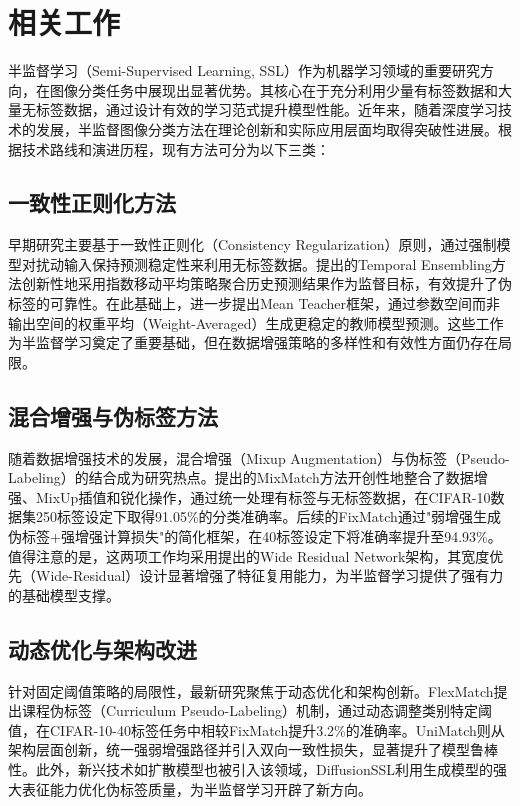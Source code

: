 \documentclass[a4paper, utf8]{ctexart}
\begin{document}
	\section{相关工作}
	
	半监督学习（Semi-Supervised Learning, SSL）作为机器学习领域的重要研究方向，在图像分类任务中展现出显著优势。其核心在于充分利用少量有标签数据和大量无标签数据，通过设计有效的学习范式提升模型性能。近年来，随着深度学习技术的发展，半监督图像分类方法在理论创新和实际应用层面均取得突破性进展。根据技术路线和演进历程，现有方法可分为以下三类：
	
	\subsection{一致性正则化方法}
	
	早期研究主要基于一致性正则化（Consistency Regularization）原则，通过强制模型对扰动输入保持预测稳定性来利用无标签数据。\cite{pimodel}提出的Temporal Ensembling方法创新性地采用指数移动平均策略聚合历史预测结果作为监督目标，有效提升了伪标签的可靠性。在此基础上，\cite{meanteacher}进一步提出Mean Teacher框架，通过参数空间而非输出空间的权重平均（Weight-Averaged）生成更稳定的教师模型预测。这些工作为半监督学习奠定了重要基础，但在数据增强策略的多样性和有效性方面仍存在局限。
	
	\subsection{混合增强与伪标签方法​}
	
	随着数据增强技术的发展，混合增强（Mixup Augmentation）与伪标签（Pseudo-Labeling）的结合成为研究热点。\cite{mixmatch}提出的MixMatch方法开创性地整合了数据增强、MixUp插值和锐化操作，通过统一处理有标签与无标签数据，在CIFAR-10数据集250标签设定下取得91.05\%的分类准确率。后续\cite{fixmatch}的FixMatch通过"弱增强生成伪标签+强增强计算损失"的简化框架，在40标签设定下将准确率提升至94.93\%。值得注意的是，这两项工作均采用\cite{wrn}提出的Wide Residual Network架构，其宽度优先（Wide-Residual）设计显著增强了特征复用能力，为半监督学习提供了强有力的基础模型支撑。
	
	\subsection{动态优化与架构改进​}
	
	针对固定阈值策略的局限性，最新研究聚焦于动态优化和架构创新。FlexMatch\cite{flexmatch}提出课程伪标签（Curriculum Pseudo-Labeling）机制，通过动态调整类别特定阈值，在CIFAR-10-40标签任务中相较FixMatch提升3.2\%的准确率。UniMatch\cite{unimatch}则从架构层面创新，统一强弱增强路径并引入双向一致性损失，显著提升了模型鲁棒性。此外，新兴技术如扩散模型也被引入该领域，DiffusionSSL\cite{diffusionssl}利用生成模型的强大表征能力优化伪标签质量，为半监督学习开辟了新方向。
	
\end{document}
